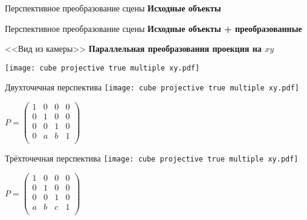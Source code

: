 \documentclass[10pt]{beamer}
\begin{document}
	
\begin{frame}{Перспективное преобразование сцены}	  
	\centering
	\textbf{Исходные объекты}
	
\end{frame}

\begin{frame}{Перспективное преобразование сцены}	  
	\centering
	\textbf{Исходные объекты + преобразованные}
	
\end{frame}




\begin{frame}{<<Вид из камеры>>}	  
	\centering
	\textbf{Параллельная преобразования проекция на $xy$}
	
	\texttt{[image: cube projective true multiple xy.pdf]} 
\end{frame}

\begin{frame}{Двухточечная перспектива}	  
	\centering
	{
		\texttt{[image: cube projective true multiple xy.pdf]} 
	}
	{	
	
			$P = 
			\begin{pmatrix}
				1&0&0&0\\
				0&1&0&0\\	
				0&0&1&0\\	
				0&a&b&1\\		
			\end{pmatrix}$
		
		
	}
	
\end{frame}

\begin{frame}{Трёхточечная перспектива}	  
	\centering
	{
		\texttt{[image: cube projective true multiple xy.pdf]} 
	}
	{	
		
		$P = 
		\begin{pmatrix}
			1&0&0&0\\
			0&1&0&0\\	
			0&0&1&0\\	
			a&b&c&1\\		
		\end{pmatrix}$
		
		
	}
	
\end{frame}


\begin{comment}
\end{comment}
\end{document}
